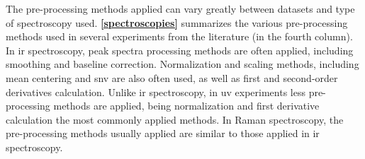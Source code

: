 The pre-processing methods applied can vary greatly between datasets and type of spectroscopy used. \textbf{\autoref{spectroscopies}} summarizes the various pre-processing methods used in several experiments from the literature (in the fourth column). In \gls{ir} spectroscopy, peak spectra processing methods are often applied, including smoothing and baseline correction. Normalization and scaling methods, including mean centering and \gls{snv} are also often used, as well as first and second-order derivatives calculation. Unlike \gls{ir} spectroscopy, in \gls{uv} experiments less pre-processing methods are applied, being normalization and first derivative calculation the most commonly applied methods. In Raman spectroscopy, the pre-processing methods usually applied are similar to those applied in \gls{ir} spectroscopy.





